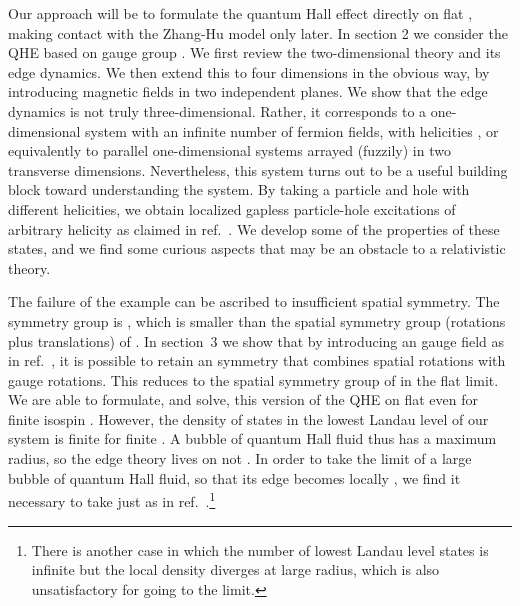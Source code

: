 \documentclass[a4paper,12pt]{article}
\providecommand{\R}{R}
\begin{document}
Our approach will be to formulate the quantum Hall effect directly on flat
\myHighlight{$\R^4$}\coordHE{}, making contact with the Zhang-Hu model only later.  In section 2 we
consider the QHE based on gauge group \coordHE{}.  We first review the
two-dimensional theory and its edge dynamics.  We then extend this to four
dimensions in the obvious way, by introducing \coordHE{} magnetic fields in two
independent planes.  We show that the edge dynamics is not truly
three-dimensional.  Rather, it corresponds to a one-dimensional system with
an infinite number of fermion fields, with helicities \coordHE{}, or
equivalently to parallel one-dimensional systems arrayed (fuzzily) in two
transverse dimensions.  Nevertheless, this system turns out to be a useful
building block toward understanding the \coordHE{} system.  By taking a particle
and hole with different helicities, we obtain localized gapless
particle-hole excitations of arbitrary helicity as claimed in ref.~\cite{hz1}. 
We develop some of the properties of these states, and we find some curious
aspects that may be an obstacle to a relativistic theory.

The failure of the
\coordHE{} example can be ascribed to insufficient spatial symmetry.  The
symmetry group is \coordHE{}, which is smaller than the spatial symmetry group
(rotations plus translations) of
\myHighlight{$\R^3$}\coordHE{}.  In section~3 we show that by introducing an \coordHE{} gauge field as
in ref.~\cite{hz1}, it is possible to retain an \coordHE{} symmetry that
combines spatial rotations with gauge rotations.  This reduces to the spatial 
symmetry group of \myHighlight{$\R^3$}\coordHE{} in the flat limit.  We are able to
formulate, and solve, this version of the QHE on flat \myHighlight{$\R^4$}\coordHE{} even for
finite isospin
\coordHE{}.  However, the
density of states in the lowest Landau level of our system is finite for
finite \coordHE{}.
A bubble of quantum Hall fluid thus has a maximum radius, so the
edge theory lives on \coordHE{} not \myHighlight{$\R^3$}\coordHE{}. In order to take the limit of a large
bubble of quantum Hall fluid, so that its edge becomes locally \myHighlight{$\R^3$}\coordHE{}, we find
it necessary to take
\coordHE{} just as in ref.~\cite{hz1}.\footnote{There is another case in
which the number of lowest Landau level states is infinite but the local
density diverges at large radius, which is also unsatisfactory for going to
the \myHighlight{$\R^3$}\coordHE{} limit.}
\end{document}
